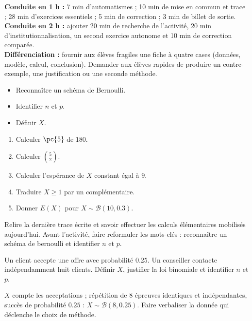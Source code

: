 \ifmxteacher
\begin{method}
\textbf{Conduite en 1 h :} 7 min d'automatismes ; 10 min de mise en commun et trace ; 28 min d'exercices essentiels ; 5 min de correction ; 3 min de billet de sortie.\\
\textbf{Conduite en 2 h :} ajouter 20 min de recherche de l'activité, 20 min d'institutionnalisation, un second exercice autonome et 10 min de correction comparée.\\
\textbf{Différenciation :} fournir aux élèves fragiles une fiche à quatre cases (données, modèle, calcul, conclusion). Demander aux élèves rapides de produire un contre-exemple, une justification ou une seconde méthode.
\end{method}
\fi
{}
\begin{objectives}\begin{itemize}\item Reconnaître un schéma de Bernoulli.\item Identifier $n$ et $p$.\item Définir $X$.\end{itemize}\end{objectives}
\begin{fluency}\begin{enumerate}\item Calculer $\pc{5}$ de $180$. \item Calculer $\binom52$. \item Calculer l'espérance de $X$ constant égal à $9$. \item Traduire $X\geq1$ par un complémentaire. \item Donner $E(X)$ pour $X\sim\mathcal B(10,\num{0,3})$. \end{enumerate}\end{fluency}
\begin{prerequisites}Relire la dernière trace écrite et savoir effectuer les calculs élémentaires mobilisés aujourd'hui. Avant l'activité, faire reformuler les mots-clés : reconnaître un schéma de bernoulli et identifier $n$ et $p$.\end{prerequisites}

\begin{activity}
Un client accepte une offre avec probabilité $\num{0,25}$. Un conseiller contacte indépendamment huit clients. Définir $X$, justifier la loi binomiale et identifier $n$ et $p$.

\end{activity}
\begin{solution}$X$ compte les acceptations ; répétition de 8 épreuves identiques et indépendantes, succès de probabilité $\num{0,25}$ : $X\sim\mathcal B(8,\num{0,25})$. Faire verbaliser la donnée qui déclenche le choix de méthode.\end{solution}

